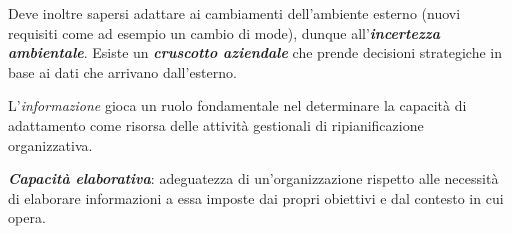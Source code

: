 \documentclass[a4paper, notitlepage, 9pt]{extreport}
\begin{document}
Deve inoltre sapersi adattare ai cambiamenti dell'ambiente esterno (nuovi requisiti come ad esempio un cambio di mode), dunque all'\textbf{\textit{incertezza ambientale}}. Esiste un \textit{\textbf{cruscotto aziendale}} che prende decisioni strategiche in base ai dati che arrivano dall'esterno.
\newline

\noindent
L'\textit{informazione} gioca un ruolo fondamentale nel determinare la capacità di adattamento come risorsa delle attività gestionali di ripianificazione organizzativa.
\newline

\noindent
\textit{\textbf{Capacità elaborativa}}: adeguatezza di un’organizzazione rispetto alle necessità di elaborare informazioni a essa imposte dai propri obiettivi e dal contesto in cui opera.
\end{document}

